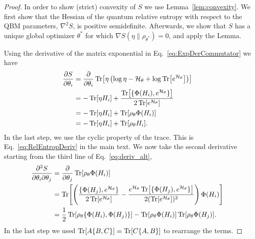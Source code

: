 \documentclass[
    aps,
    prx,
    onecolumn
]{revtex4-2}
\begin{document}
\begin{proof}
In order to show (strict) convexity of $S$ we use Lemma~\ref{lem:convexity}. We first show that the Hessian of the quantum relative entropy with respect to the QBM parameters, $\nabla^2 S$, is positive semidefinite. Afterwards, we show that $S$ has a unique global optimizer $\theta^*$ for which $\nabla S(\eta \|\rho_{\theta^*})=0$, and apply the Lemma. 

Using the derivative of the matrix exponential in Eq.~\eqref{eq:ExpDerCommutator} we have
\begin{align}
\begin{split}
\label{eq:deriv_alt}
    \frac{\partial S}{\partial \theta_{i}} &= \frac{\partial}{\partial \theta_{i}} \Tr[ \eta \left( \log{\eta}-\mathcal{H}_\theta+\log \Tr[e^{\mathcal{H}_\theta} ] \right ) ] \\
    &= -\Tr[\eta H_{i}] + \frac{ \Tr[ \{\Phi(H_i), e^{\mathcal{H}_\theta} \} ] } {2 \Tr[e^{\mathcal{H}_\theta}] }  \\
    &= -\Tr[\eta H_{i}] +\Tr[\rho_\theta \Phi(H_{i})] \\
    &= -\Tr[\eta H_{i}] +\Tr[\rho_\theta H_{i}].
\end{split}
\end{align}
In the last step, we use the cyclic property of the trace. This is Eq.~\eqref{eq:RelEntropDeriv} in the main text.
We now take the second derivative starting from the third line of Eq.~\eqref{eq:deriv_alt}, 
\begin{align}
\begin{split}
\label{eq:hessian_new}
    \frac{\partial^2 S}{\partial \theta_{i} \partial \theta_{j}} &=  \frac{\partial}{\partial \theta_{j} } \Tr[\rho_\theta \Phi(H_{i})] \\
    &= \Tr[\left( \frac{ \{ \Phi(H_j), e^{\mathcal{H}_\theta} \} } {2 \Tr[e^{\mathcal{H}_\theta} ] }  - \frac{ e^{\mathcal{H}_\theta} \Tr[ \{ \Phi(H_j), e^{\mathcal{H}_\theta} \} ] } {2 (\Tr[e^{\mathcal{H}_\theta} ])^2} \right)  \Phi(H_{i}) ]\\
    &= \frac{1}{2} \Tr[ \rho_\theta \{ \Phi(H_i), \Phi(H_j) \}] - \Tr[ \rho_\theta \Phi(H_i)] \Tr[ \rho_\theta \Phi(H_j)] . 
\end{split}
\end{align} 
In the last step we used $\Tr[ A \{B, C\}] = \Tr[ C \{A, B\}]$ to rearrange the terms.


\end{proof}
\end{document}
